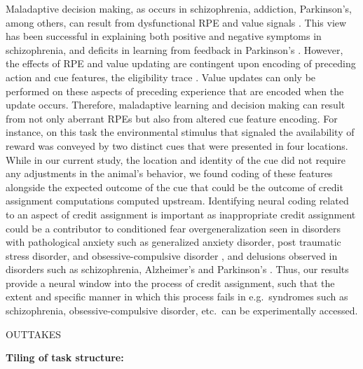 \documentclass[11pt]{article}
\let\cite=\citep
\begin{document}
{Maladaptive decision making, as occurs in schizophrenia, addiction,
Parkinson’s, among others, can result from dysfunctional RPE and value
signals \cite{Frank2004,Gradin2011,Maia2011}. This view has been
successful in explaining both positive and negative symptoms in
schizophrenia, and deficits in learning from feedback in Parkinson’s
\cite{Frank2004,Gradin2011}. However, the effects of RPE and value
updating are contingent upon encoding of preceding action and cue
features, the eligibility trace \cite{Lee2012,sutton1998}. Value
updates can only be performed on these aspects of preceding experience
that are encoded when the update occurs. Therefore, maladaptive
learning and decision making can result from not only aberrant RPEs
but also from altered cue feature encoding. For instance, on this task
the environmental stimulus that signaled the availability of reward
was conveyed by two distinct cues that were presented in four
locations. While in our current study, the location and identity of
the cue did not require any adjustments in the animal’s behavior, we
found coding of these features alongside the expected outcome of the
cue that could be the outcome of credit assignment computations
computed upstream. Identifying neural coding related to an aspect of
credit assignment is important as inappropriate credit assignment
could be a contributor to conditioned fear overgeneralization seen in
disorders with pathological anxiety such as generalized anxiety
disorder, post traumatic stress disorder, and obsessive-compulsive
disorder \cite{Kaczkurkin2013,Kaczkurkin2017,Lissek2014}, and
delusions observed in disorders such as schizophrenia, Alzheimer’s and
Parkinson’s \cite{Corlett2010,Kapur2003}. Thus, our results provide a
neural window into the process of credit assignment, such that the
extent and specific manner in which this process fails in
e.g.\ syndromes such as schizophrenia, obsessive-compulsive disorder,
etc.\ can be experimentally accessed.

OUTTAKES

{\bf Tiling of task structure:}

}
\end{document}
